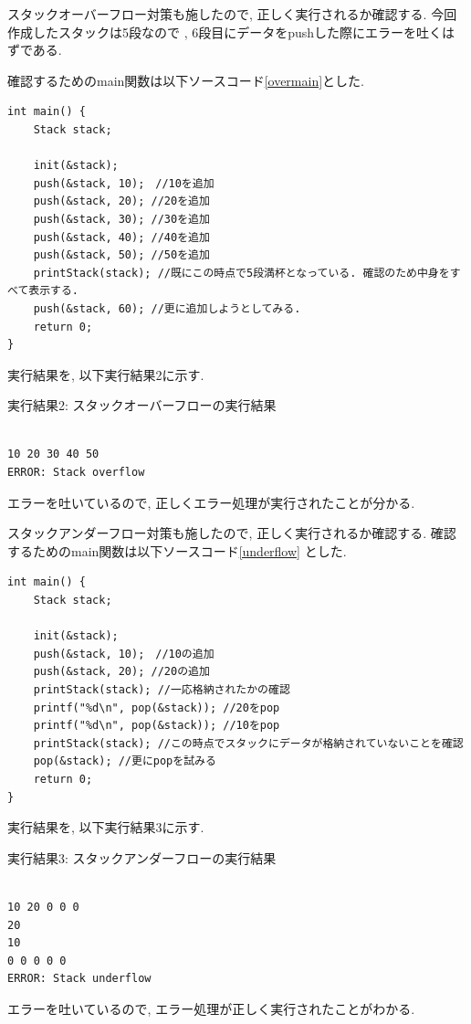\documentclass[a4j]{jsarticle}
\begin{document}
スタックオーバーフロー対策も施したので, 正しく実行されるか確認する. 今回作成したスタックは5段なので
, 6段目にデータをpushした際にエラーを吐くはずである. 

確認するためのmain関数は以下ソースコード\ref{overmain}とした. 
\begin{lstlisting}[label = overmain, caption = スタックオーバーフローの動作確認のためのmain関数]
int main() {
	Stack stack;

	init(&stack);
	push(&stack, 10);　//10を追加
	push(&stack, 20); //20を追加
	push(&stack, 30); //30を追加
	push(&stack, 40); //40を追加
	push(&stack, 50); //50を追加
	printStack(stack); //既にこの時点で5段満杯となっている. 確認のため中身をすべて表示する. 
	push(&stack, 60); //更に追加しようとしてみる. 
	return 0;
}
\end{lstlisting}
実行結果を, 以下実行結果2に示す. 
\begin{breakitembox}[l]{実行結果2: スタックオーバーフローの実行結果}
\begin{verbatim}

10 20 30 40 50
ERROR: Stack overflow
\end{verbatim}
\end{breakitembox}
エラーを吐いているので, 正しくエラー処理が実行されたことが分かる. 

スタックアンダーフロー対策も施したので, 正しく実行されるか確認する. 確認するためのmain関数は以下ソースコード\ref{underflow}
とした. 
\begin{lstlisting}[label = underflow, caption = スタックアンダーフロー動作確認のためのmain関数]
int main() {
	Stack stack;

	init(&stack);
	push(&stack, 10);　//10の追加
	push(&stack, 20); //20の追加
	printStack(stack); //一応格納されたかの確認
	printf("%d\n", pop(&stack)); //20をpop
	printf("%d\n", pop(&stack)); //10をpop
	printStack(stack); //この時点でスタックにデータが格納されていないことを確認
	pop(&stack); //更にpopを試みる
	return 0;
}
\end{lstlisting}
実行結果を, 以下実行結果3に示す. 
\begin{breakitembox}[l]{実行結果3: スタックアンダーフローの実行結果}
\begin{verbatim}

10 20 0 0 0
20
10
0 0 0 0 0
ERROR: Stack underflow
\end{verbatim}
\end{breakitembox}
エラーを吐いているので, エラー処理が正しく実行されたことがわかる. 

\end{document}
